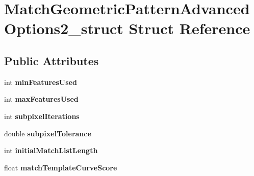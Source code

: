 \hypertarget{structMatchGeometricPatternAdvancedOptions2__struct}{
\section{MatchGeometricPatternAdvancedOptions2\_\-struct Struct Reference}
\label{structMatchGeometricPatternAdvancedOptions2__struct}
}
\subsection*{Public Attributes}
\begin{DoxyCompactItemize}
\item 
\hypertarget{structMatchGeometricPatternAdvancedOptions2__struct_aad6d565ae9492f6e58c5221c38693d53}{
int {\bfseries minFeaturesUsed}}
\label{structMatchGeometricPatternAdvancedOptions2__struct_aad6d565ae9492f6e58c5221c38693d53}

\item 
\hypertarget{structMatchGeometricPatternAdvancedOptions2__struct_a36097448147ee2536708477c3823155b}{
int {\bfseries maxFeaturesUsed}}
\label{structMatchGeometricPatternAdvancedOptions2__struct_a36097448147ee2536708477c3823155b}

\item 
\hypertarget{structMatchGeometricPatternAdvancedOptions2__struct_a479b91cb231de6e67e9e1d061289b144}{
int {\bfseries subpixelIterations}}
\label{structMatchGeometricPatternAdvancedOptions2__struct_a479b91cb231de6e67e9e1d061289b144}

\item 
\hypertarget{structMatchGeometricPatternAdvancedOptions2__struct_a1af9de9fb6c16afaa2cf2bee12603340}{
double {\bfseries subpixelTolerance}}
\label{structMatchGeometricPatternAdvancedOptions2__struct_a1af9de9fb6c16afaa2cf2bee12603340}

\item 
\hypertarget{structMatchGeometricPatternAdvancedOptions2__struct_a41b0bf9c9b5d42af21b53162c9dbab16}{
int {\bfseries initialMatchListLength}}
\label{structMatchGeometricPatternAdvancedOptions2__struct_a41b0bf9c9b5d42af21b53162c9dbab16}

\item 
\hypertarget{structMatchGeometricPatternAdvancedOptions2__struct_a6d6369b770e46d86ea6f2c9bcd5223ac}{
float {\bfseries matchTemplateCurveScore}}
\label{structMatchGeometricPatternAdvancedOptions2__struct_a6d6369b770e46d86ea6f2c9bcd5223ac}


\end{DoxyCompactItemize}
